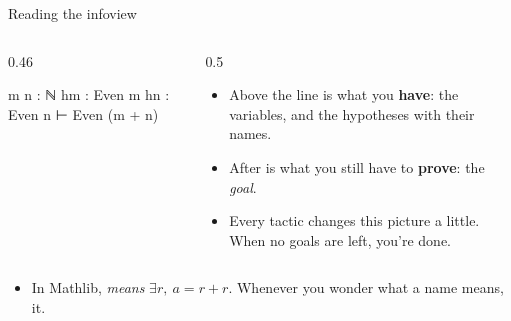 \documentclass[10pt, aspectratio=169]{beamer}
\begin{document}
\begin{frame}[fragile]{Reading the infoview}
\begin{columns}[c]
\begin{column}{0.46\textwidth}
\begin{goal}
m n : ℕ
hm : Even m
hn : Even n
⊢ Even (m + n)
\end{goal}
\end{column}
\begin{column}{0.5\textwidth}
\begin{itemize}
\item Above the line is what you \textbf{have}: the variables, and the hypotheses with their names.
\item After  is what you still have to \textbf{prove}: the \emph{goal}.
\item Every tactic changes this picture a little. When no goals are left, you're done.
\end{itemize}
\end{column}
\end{columns}

\vspace{1em}
\begin{itemize}
\item In Mathlib,  \emph{means} $\exists r,\ a = r + r$. Whenever you wonder what a name means,  it.
\end{itemize}
\end{frame}
\end{document}
